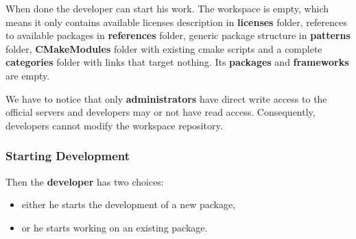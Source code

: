 \documentclass[12pt,a4paper]{article}
\begin{document}
When done the developer can start his work. The workspace is empty, which means it only contains available licenses description in \textbf{licenses} folder, references to available packages in \textbf{references} folder, generic package structure in \textbf{patterns} folder, \textbf{CMakeModules} folder with existing cmake scripts and a complete \textbf{categories} folder with links that target nothing. Its \textbf{packages} and \textbf{frameworks} are empty.

We have to notice that only \textbf{administrators} have direct write access to the official servers and developers may or not have read access. Consequently, developers cannot modify the workspace repository.
 
\subsubsection{Starting Development}

Then the \textbf{developer} has two choices:
\begin{itemize}
\item either he starts the development of a new package,
\item or he starts working on an existing package.
\end{itemize}
\end{document}
